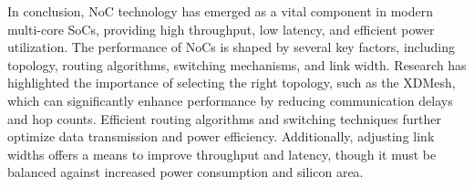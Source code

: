 
In conclusion, NoC technology has emerged as a vital component in modern multi-core SoCs, providing high throughput, low latency, and efficient power utilization.
The performance of NoCs is shaped by several key factors, including topology, routing algorithms, switching mechanisms, and link width.
Research has highlighted the importance of selecting the right topology, such as the XDMesh, which can significantly enhance performance by reducing communication delays and hop counts.
Efficient routing algorithms and switching techniques further optimize data transmission and power efficiency.
Additionally, adjusting link widths offers a means to improve throughput and latency, though it must be balanced against increased power consumption and silicon area.